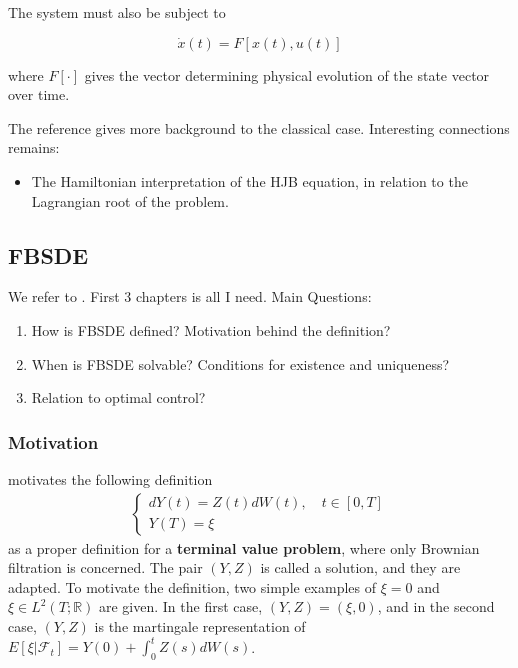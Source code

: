 The system must also be subject to

\[
\dot{x}(t)=F[x(t), u(t)]
\]

where $F[\cdot]$ gives the vector determining physical evolution of the state vector over time.

The reference \autocite{yongStochasticControls1999} gives more background to the classical case. Interesting connections remains:

\begin{itemize}
    \item The Hamiltonian interpretation of the HJB equation, in relation to the Lagrangian root of the problem.
\end{itemize}




\subsection{FBSDE}
\label{subsec:fbsde}

We refer to \autocite{maFBSDE2007}. First 3 chapters is all I need. Main Questions:
\begin{enumerate}
    \item How is FBSDE defined? Motivation behind the definition?
    \item When is FBSDE solvable? Conditions for existence and uniqueness?
    \item Relation to optimal control?
\end{enumerate}

\subsubsection{Motivation}

\autocite[eqn.~(1.5)]{maFBSDE2007} motivates the following definition
\begin{align}
\left\{\begin{array}{l}
d Y(t)=Z(t) d W(t), \quad t \in[0, T] \\
Y(T)=\xi
\end{array}\right.
\end{align}
as a proper definition for a \textbf{terminal value problem}, where only Brownian filtration is concerned. The pair $(Y, Z)$ is called a solution, and they are adapted. To motivate the definition, two simple examples of $\xi = 0$ and $\xi \in L^2(T; \mathbb{R})$ are given. In the first case, $(Y, Z) = (\xi, 0)$, and in the second case, $(Y, Z)$ is the martingale representation of $E[\xi | \mathcal{F}_t] = Y(0) + \int_0^t Z(s) d W(s)$.

